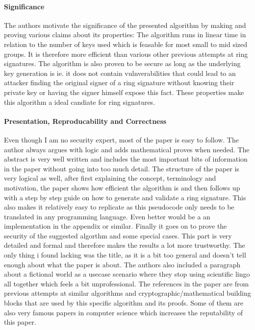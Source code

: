 \documentclass{scrartcl}
\begin{document}
\paragraph{Significance}{
The authors motivate the significance of the presented algorithm by making and proving various claims about its properties:
The algorithm runs in linear time in relation to the number of keys used which is feasable for most small to mid sized groups. It is therefore more efficient than various other previous attempts at ring signatures.
The algorithm is also proven to be secure as long as the underlying key generation is ie. it does not contain vulnverabilities that could lead to an attacker finding the original signer of a ring signature without knowing their private key or having the signer himself expose this fact.
These properties make this algorithm a ideal candiate for ring signatures.
}
\paragraph{Presentation, Reproducability and Correctness}{
Even though I am no security expert, most of the paper is easy to follow. The author always argues with logic and adds mathematical proves when needed. 
The abstract is very well written and includes the most important bits of information in the paper without going into too much detail. The structure of the paper is very logical as well, after first explaining the concept,  terminology and motivation, the paper shows how efficient the algorithm is and then follows up with a step by step guide on how to generate and validate a ring signature. This also makes it relatively easy to replicate as this pseudocode only needs to be translated in any programming language. Even better would be a an implementation in the appendix or similar. Finally it goes on to prove the security of the suggested algorthm and some special cases. This part is very detailed and formal and therefore makes the results a lot more trustworthy.
The only thing i found lacking was the title, as it is a bit too general and doesn't tell enough about what the paper is about. The authors also included a paragraph about a fictional world as a usecase scenario where they stop using scientific lingo all together which feels a bit  unprofessional.
The references in the paper are from previous attempts at similar algorithms and cryptographic/mathematical building blocks that are used by this specific algorithm and its proofs. Some of them are also very famous papers in computer science which increases the reputability of this paper.
}





\end{document}
